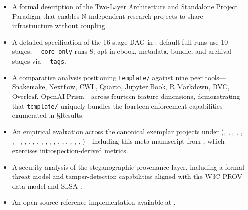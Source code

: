 \documentclass[
  english,
]{article}
\providecommand{\tightlist}{%
  \setlength{\itemsep}{0pt}\setlength{\parskip}{0pt}}
\begin{document}
\begin{itemize}
\tightlist
\item
  A formal description of the Two-Layer Architecture and Standalone
  Project Paradigm that enables N independent research projects to share
  infrastructure without coupling.
\item
  A detailed specification of the 16-stage DAG in
  : default full runs
  use 10 stages; \texttt{-\/-core-only} runs 8; opt-in ebook, metadata,
  bundle, and archival stages via \texttt{-\/-tags}.
\item
  A comparative analysis positioning \texttt{template/} against nine
  peer tools---Snakemake, Nextflow, CWL, Quarto, Jupyter Book, R
  Markdown, DVC, Overleaf, OpenAI Prism---across fourteen feature
  dimensions, demonstrating that \texttt{template/} uniquely bundles the
  fourteen enforcement capabilities enumerated in §Results.
\item
  An empirical evaluation across the canonical exemplar projects under
  (,
  ,
  ,
  ,
  ,
  ,
  ,
  ,
  ,
  ,
  ,
  ,
  ,
  ,
  ,
  ,
  ,
  ,
  ,
  ,
  ,
  ,
  )---including this meta
  manuscript from , which
  exercises introspection-derived metrics.
\item
  A security analysis of the steganographic provenance layer, including
  a formal threat model and tamper-detection capabilities aligned with
  the W3C PROV data model \citep{moreau2013provdm} and SLSA
  \citep{openssf2023slsa}.
\item
  An open-source reference implementation available at
  .
\end{itemize}
\end{document}
